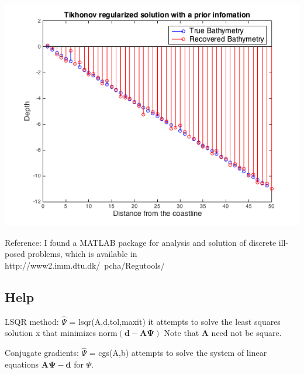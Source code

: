 \begin{center}
\includegraphics[scale=0.6]{img/Tikhnove_reg.png} 
\end{center}

Reference: I found a MATLAB package for analysis and solution of discrete ill-posed problems, which is available in http://www2.imm.dtu.dk/~pcha/Regutools/\\

\subsection{Help}

LSQR method: $\hat{\Psi}$ = lsqr(A,d,tol,maxit) it attempts to solve the least squares solution x that minimizes norm$(\mathbf{d}-\mathbf{A\Psi})$ Note that $\mathbf{A}$ need not be square.


Conjugate gradients: $\hat{\Psi}$ = cgs(A,b) attempts to solve the system of linear equations $\mathbf{A}\mathbf{\Psi} -  \mathbf{d}$ for $\Psi$.

